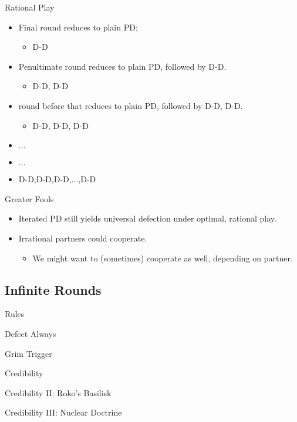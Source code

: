 \documentclass[pdf]{beamer}
\begin{document}
\begin{frame}{Rational Play}
  \begin{itemize}
  \item Final round reduces to plain PD;
    \begin{itemize}
      \item D-D
    \end{itemize}
  \pause\item Penultimate round reduces to plain PD, followed by D-D.
    \begin{itemize}
      \item D-D, D-D
    \end{itemize}
  \pause\item round before that reduces to plain PD, followed by D-D, D-D.
    \begin{itemize}
      \item D-D, D-D, D-D
    \end{itemize}
  \pause\item $\ldots$
  \pause\item $\ldots$
  \pause\item D-D,D-D,D-D,$\ldots$,D-D
\end{itemize}
\end{frame}

\begin{frame}{Greater Fools}
  \begin{itemize}
  \item Iterated PD still yields universal defection under optimal, rational play.
  \pause\item Irrational partners could cooperate.
  \begin{itemize}
    \item We might want to (sometimes) cooperate as well, depending on partner.
    \end{itemize}
  \end{itemize}
\end{frame}


\subsection{Infinite Rounds}
\begin{frame}{Rules}
\end{frame}
\begin{frame}{Defect Always}
\end{frame}
\begin{frame}{Grim Trigger}
\end{frame}
\begin{frame}{Credibility}
\end{frame}
\begin{frame}{Credibility II: Roko's Basilisk}
\end{frame}
\begin{frame}{Credibility III: Nuclear Doctrine}
\end{frame}
\end{document}
